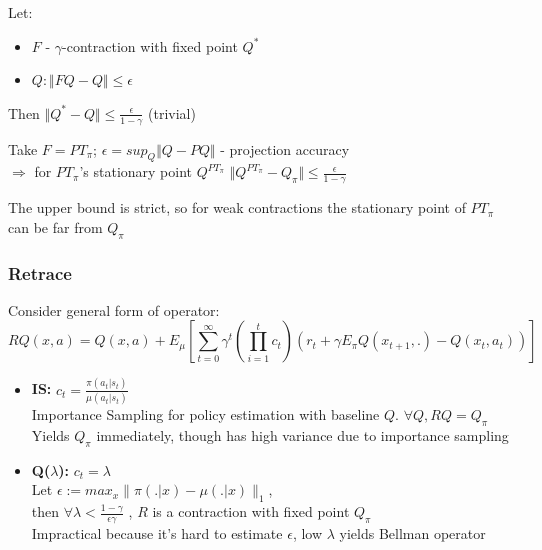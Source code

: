 \documentclass{beamer}
\begin{document}
\begin{frame}[t]
Let:
\begin{itemize}
\item $F$ - $\gamma$-contraction with fixed point $Q^*$\\
\item $Q: \Vert FQ - Q \Vert \leq \epsilon$
\end{itemize}
\vspace{3mm}
Then $\Vert Q^* - Q \Vert \leq \frac{\epsilon}{1-\gamma}$ (trivial)

\vspace{4mm}

Take $F = PT_\pi$; $\epsilon = sup_Q \Vert Q - PQ \Vert$ - projection accuracy\\
$\Rightarrow$ for $PT_\pi$'s stationary point $Q^{PT_\pi}$ $\Vert Q^{PT_\pi} - Q_\pi \Vert \leq \frac{\epsilon}{1-\gamma}$\\

\vspace{4mm}

The upper bound is strict, so for weak contractions the stationary point of $PT_\pi$ can be far from $Q_\pi$

\end{frame}


\begin{frame}[t]
\frametitle{Retrace}

Consider general form of operator:
\begin{equation*}
R Q (x,a) = Q(x,a) + E_\mu \left[ \sum_{t=0}^\infty \gamma^t \left( \prod_{i=1}^{t} c_t \right) \left( r_t + \gamma E_\pi Q (x_{t+1},.) - Q(x_t,a_t) \right) \right]
\end{equation*}

\begin{itemize}
\item \textbf{IS:} $c_t = \frac{\pi(a_t | s_t) }{\mu(a_t | s_t)}$ \\
Importance Sampling for policy estimation with baseline $Q$. $\forall Q,  R Q = Q_\pi$\\
Yields $Q_\pi$ immediately, though has high variance due to importance sampling

\item \textbf{Q($\lambda$):} $c_t = \lambda$ \\
Let $\epsilon := max_x \parallel \pi(.|x) - \mu(.|x) \parallel _1$, \\
then $\forall \lambda < \frac{1-\gamma}{\epsilon \gamma}$ , $R$ is a contraction 
with fixed point $Q_\pi$\\
Impractical because it's hard to estimate $\epsilon$, low $\lambda$ yields Bellman operator


\end{itemize}
\end{frame}
\end{document}
